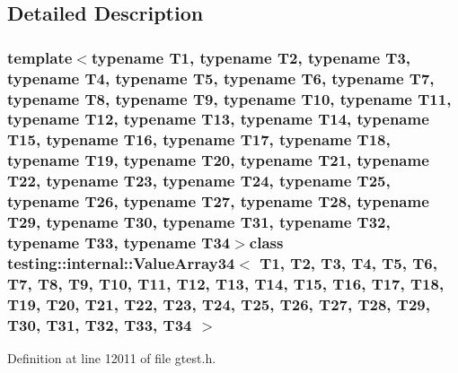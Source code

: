 \subsection{\-Detailed \-Description}
\subsubsection*{template$<$typename T1, typename T2, typename T3, typename T4, typename T5, typename T6, typename T7, typename T8, typename T9, typename T10, typename T11, typename T12, typename T13, typename T14, typename T15, typename T16, typename T17, typename T18, typename T19, typename T20, typename T21, typename T22, typename T23, typename T24, typename T25, typename T26, typename T27, typename T28, typename T29, typename T30, typename T31, typename T32, typename T33, typename T34$>$class testing\-::internal\-::\-Value\-Array34$<$ T1, T2, T3, T4, T5, T6, T7, T8, T9, T10, T11, T12, T13, T14, T15, T16, T17, T18, T19, T20, T21, T22, T23, T24, T25, T26, T27, T28, T29, T30, T31, T32, T33, T34 $>$}



\-Definition at line 12011 of file gtest.\-h.



